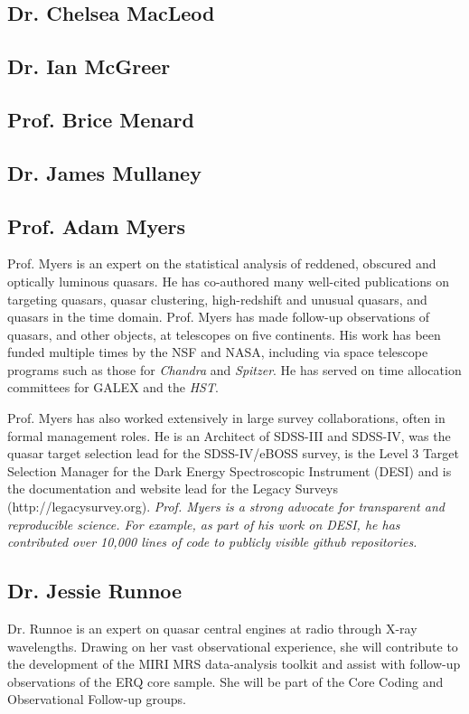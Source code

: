\subsection{Dr. Chelsea MacLeod}


\subsection{Dr. Ian McGreer}


\subsection{Prof. Brice Menard}	


\subsection{Dr. James Mullaney}


\subsection{Prof. Adam Myers}
Prof. Myers is an expert on the statistical analysis of reddened,
obscured and optically luminous quasars. He has co-authored many
well-cited publications on targeting quasars, quasar clustering,
high-redshift and unusual quasars, and quasars in the time
domain. Prof. Myers has made follow-up observations of quasars, and
other objects, at telescopes on five continents. His work has been
funded multiple times by the NSF and NASA, including via space
telescope programs such as those for {\it Chandra} and {\it Spitzer}. He has
served on time allocation committees for GALEX and the {\it HST}. 

\smallskip \smallskip
\noindent
Prof. Myers has also worked extensively in large survey
collaborations, often in formal management roles. He is an Architect
of SDSS-III and SDSS-IV, was the quasar target selection lead for the
SDSS-IV/eBOSS survey, is the Level 3 Target Selection Manager for the
Dark Energy Spectroscopic Instrument (DESI) and is the documentation
and website lead for the Legacy Surveys
(http://legacysurvey.org). {\it Prof. Myers is a strong advocate for
transparent and reproducible science. For example, as part of his work
on DESI, he has contributed over 10,000 lines of code to publicly
visible github repositories.}


\subsection{Dr. Jessie Runnoe}
Dr. Runnoe is an expert on quasar central engines at radio through
X-ray wavelengths.  Drawing on her vast observational experience, she
will contribute to the development of the MIRI MRS data-analysis
toolkit and assist with follow-up observations of the ERQ core sample.
She will be part of the Core Coding and Observational Follow-up
groups.

